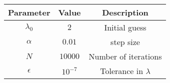 
\begin{center}
\begin{tabular}{|c|c|c|}
\hline
	\textbf{Parameter}& \textbf{Value}& \textbf{Description}\\ \hline
	$\lambda_0$	&$2$		        &Initial guess\\ \hline
	$\alpha$	&$0.01$	                &step size\\ \hline
	$N$	        &$10000$                &Number of iterations\\ \hline
	$\epsilon$	&$10^{-7}$             &Tolerance in $\lambda$\\ \hline
\end{tabular}
\end{center}
